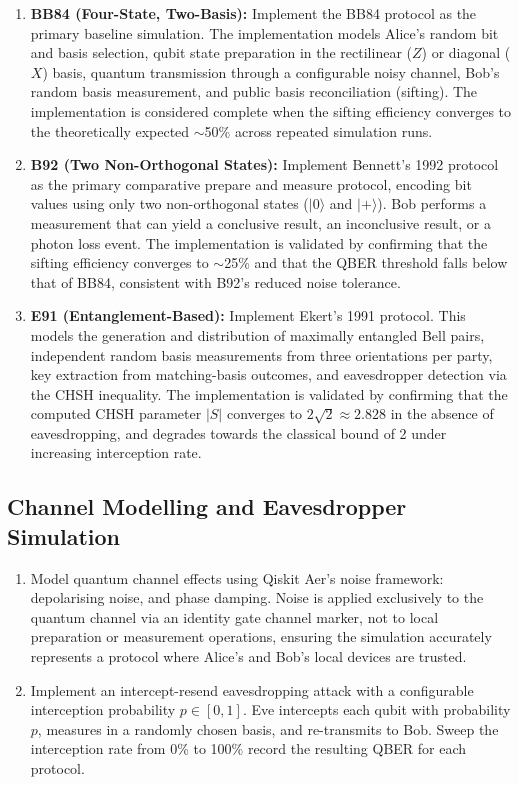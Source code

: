 \documentclass[10pt, a4paper]{report}
\begin{document}
\begin{enumerate}[label=\textbf{O2.\arabic*}, leftmargin=1.5cm]
    \item \textbf{BB84 (Four-State, Two-Basis):} Implement the BB84 protocol as the primary baseline simulation. The implementation models Alice's random bit and basis selection, qubit state preparation in the rectilinear ($Z$) or diagonal ($X$) basis, quantum transmission through a configurable noisy channel, Bob's random basis measurement, and public basis reconciliation (sifting). The implementation is considered complete when the sifting efficiency converges to the theoretically expected $\sim$50\% across repeated simulation runs. %

    \item \textbf{B92 (Two Non-Orthogonal States):} Implement Bennett's 1992 protocol as the primary comparative prepare and measure protocol, encoding bit values using only two non-orthogonal states ($|0\rangle$ and $|+\rangle$). Bob performs a measurement that can yield a conclusive result, an inconclusive result, or a photon loss event. The implementation is validated by confirming that the sifting efficiency converges to $\sim$25\% and that the QBER threshold falls below that of BB84, consistent with B92's reduced noise tolerance.

    \item \textbf{E91 (Entanglement-Based):} Implement Ekert's 1991 protocol. This models the generation and distribution of maximally entangled Bell pairs, independent random basis measurements from three orientations per party, key extraction from matching-basis outcomes, and eavesdropper detection via the CHSH inequality. The implementation is validated by confirming that the computed CHSH parameter $|S|$ converges to $2\sqrt{2} \approx 2.828$ in the absence of eavesdropping, and degrades towards the classical bound of 2 under increasing interception rate.
\end{enumerate}

\subsection{Channel Modelling and Eavesdropper Simulation}

\begin{enumerate}[label=\textbf{O3.\arabic*}, leftmargin=1.5cm]
    \item Model quantum channel effects using Qiskit Aer's noise framework: depolarising noise, and phase damping. Noise is applied exclusively to the quantum channel via an identity gate channel marker, not to local preparation or measurement operations, ensuring the simulation accurately represents a protocol where Alice's and Bob's local devices are trusted.
    
    \item Implement an intercept-resend eavesdropping attack with a configurable interception probability $p \in [0,1]$. Eve intercepts each qubit with probability $p$, measures in a randomly chosen basis, and re-transmits to Bob. Sweep the interception rate from 0\% to 100\%  record the resulting QBER for each protocol.
    
\end{enumerate}
\end{document}
